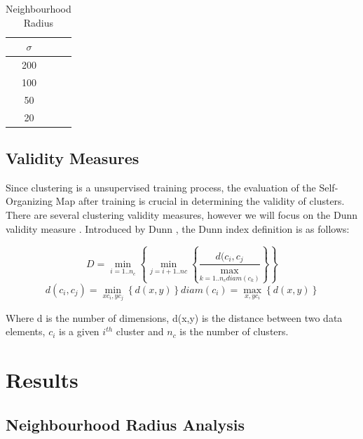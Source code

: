 \documentclass{IEEEtran}
\begin{document}
{\renewcommand{\arraystretch}{2}%
\begin{table}[!htbp]
\caption {Neighbourhood Radius} \small
\centering
\begin{tabular}{|c|c|}
\hline
$\sigma$\\
\hline
200  \\
100  \\
50   \\
20  \\
\hline
\end{tabular}
\label{tab:neighbourhoodvalues}
\end{table}
}

\subsection{Validity Measures}
Since clustering is a unsupervised training process, the evaluation of the Self-Organizing Map after training is crucial in determining the validity of clusters. There are several clustering validity measures, however we will focus on the Dunn validity measure \cite{clustervaliditymeasurement} . Introduced by Dunn \cite{dunnval}, the Dunn index definition is as follows:

\begin{equation}
D = \min_{i=1..n_{c}} \left\lbrace \min_{j=i+1..n{c}}\left\lbrace\frac{d(c_{i},c_{j}}{\max_{k=1..n_{c}diam(c_{k})}}\right\rbrace \right\rbrace
\end{equation}
\begin{equation}
d(c_{i},c_{j}) = \min_{x c_{i},y c_{j}} \left\lbrace d(x,y) \right\rbrace 
diam(c_{i}) = \max_{x,y  c_{i}} \left\lbrace d(x,y)\right\rbrace
\end{equation}


Where d is the number of dimensions, d(x,y) is the distance between two data elements, $c_{i}$ is a given $i^{th}$ cluster and $n_{c}$ is the number of clusters.


\section{Results} 

\subsection{Neighbourhood Radius Analysis}
\end{document}
